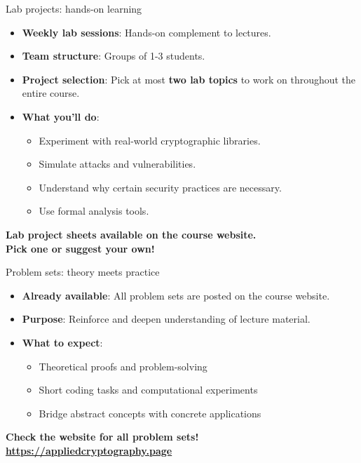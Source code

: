 \documentclass[aspectratio=169, lualatex, handout]{beamer}
\begin{document}
\begin{frame}{Lab projects: hands-on learning}
	\begin{itemize}[<+->]
		\item \textbf{Weekly lab sessions}: Hands-on complement to lectures.
		\item \textbf{Team structure}: Groups of 1-3 students.
		\item \textbf{Project selection}: Pick at most \textbf{two lab topics} to work on throughout the entire course.
		\item \textbf{What you'll do}:
		      \begin{itemize}
			      \item Experiment with real-world cryptographic libraries.
			      \item Simulate attacks and vulnerabilities.
			      \item Understand why certain security practices are necessary.
			      \item Use formal analysis tools.
		      \end{itemize}
	\end{itemize}
	\vspace{0.1cm}
	\begin{center}
		\Large\textcolor{cipherprimary}{\textbf{Lab project sheets available on the course website. \\ Pick one or suggest your own!}}
	\end{center}
\end{frame}

\begin{frame}{Problem sets: theory meets practice}
	\begin{itemize}[<+->]
		\item \textbf{Already available}: All problem sets are posted on the course website.
		\item \textbf{Purpose}: Reinforce and deepen understanding of lecture material.
		\item \textbf{What to expect}:
		      \begin{itemize}
			      \item Theoretical proofs and problem-solving
			      \item Short coding tasks and computational experiments
			      \item Bridge abstract concepts with concrete applications
		      \end{itemize}
	\end{itemize}
	\vspace{0.5cm}
	\begin{center}
		\Large\textcolor{cipherprimary}{\textbf{Check the website for all problem sets! \\ \url{https://appliedcryptography.page}}}
	\end{center}
\end{frame}
\end{document}

